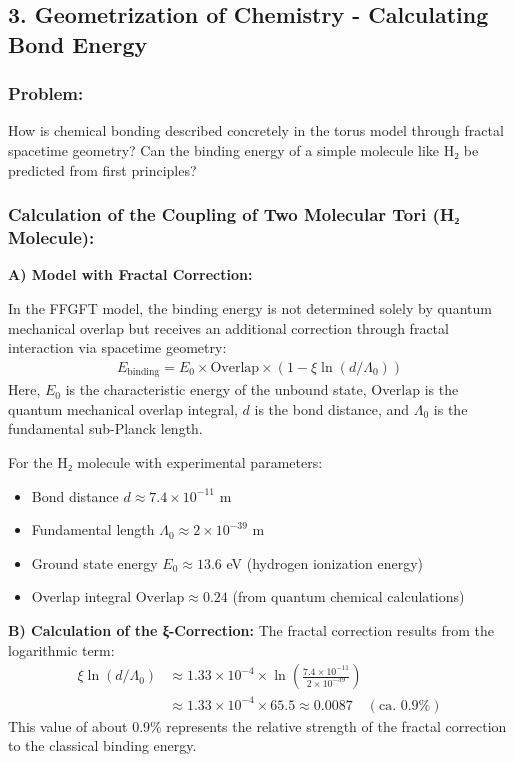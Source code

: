 	\subsection*{3. Geometrization of Chemistry - Calculating Bond Energy}
	
	\subsubsection*{Problem:}
	How is chemical bonding described concretely in the torus model through fractal spacetime geometry? Can the binding energy of a simple molecule like H₂ be predicted from first principles?
	
	\subsubsection*{Calculation of the Coupling of Two Molecular Tori (H₂ Molecule):}
	
	\textbf{A) Model with Fractal Correction:}
	
	In the FFGFT model, the binding energy is not determined solely by quantum mechanical overlap but receives an additional correction through fractal interaction via spacetime geometry:
	\begin{align*}
		E_{\text{binding}} = E_0 \times \text{Overlap} \times \left(1 - \xi \ln(d/\Lambda_0)\right)
	\end{align*}
	Here, $E_0$ is the characteristic energy of the unbound state, $\text{Overlap}$ is the quantum mechanical overlap integral, $d$ is the bond distance, and $\Lambda_0$ is the fundamental sub-Planck length.
	
	For the H₂ molecule with experimental parameters:
	\begin{itemize}
		\item Bond distance $d \approx 7.4 \times 10^{-11}$ m
		\item Fundamental length $\Lambda_0 \approx 2 \times 10^{-39}$ m
		\item Ground state energy $E_0 \approx 13.6$ eV (hydrogen ionization energy)
		\item Overlap integral $\text{Overlap} \approx 0.24$ (from quantum chemical calculations)
	\end{itemize}
	
	\textbf{B) Calculation of the ξ-Correction:}
	The fractal correction results from the logarithmic term:
	\begin{align*}
		\xi \ln(d/\Lambda_0) &\approx 1.33 \times 10^{-4} \times \ln\left(\frac{7.4 \times 10^{-11}}{2 \times 10^{-39}}\right) \\
		&\approx 1.33 \times 10^{-4} \times 65.5 \approx 0.0087 \quad (\text{ca. } 0.9\%)
	\end{align*}
	This value of about 0.9\% represents the relative strength of the fractal correction to the classical binding energy.
	
